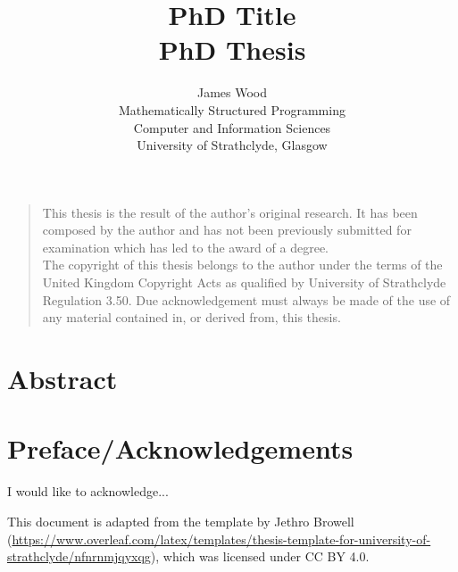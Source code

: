 \documentclass[a4paper,oneside,11pt]{book}
\title{PhD Title \\ PhD Thesis}
\author{James Wood
\\ \small Mathematically Structured Programming\\[-0.8ex]
\small Computer and Information Sciences\\[-0.8ex]
\small University of Strathclyde, Glasgow\\
}
\theoremstyle{definition}
\begin{document}
\maketitle


\frontmatter

\vspace*{\fill}
\noindent
\begin{quote}
  \centering
  This thesis is the result of the author's original research. It has been composed by the author and has not been previously submitted for examination which has led to the award of a degree. \\[5pt]
  The copyright of this thesis belongs to the author under the terms of the United Kingdom Copyright Acts as qualified by University of Strathclyde Regulation 3.50. Due acknowledgement must always be made of the use of any material contained in, or derived from, this thesis. \\[5pt]
\end{quote}
\vspace*{\fill}



\chapter{Abstract}



\tableofcontents

\listoffigures

\listoftables



\chapter{Preface/Acknowledgements}
I would like to acknowledge...

This document is adapted from the template by Jethro Browell
(\url{https://www.overleaf.com/latex/templates/thesis-template-for-university-of-strathclyde/nfnrnmjqyxqg}),
which was licensed under CC BY 4.0.



\mainmatter
\end{document}
